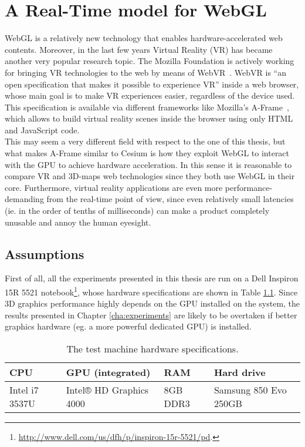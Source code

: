 ﻿%
\chapter{A Real-Time model for WebGL} \label{cha:rt_model}

WebGL is a relatively new technology that enables hardware-accelerated web
contents. Moreover, in the last few years Virtual Reality (VR) has became
another very popular research topic. The Mozilla Foundation is actively working
for bringing VR technologies to the web by means of WebVR~\cite{mozvr}. WebVR is
``an open specification that makes it possible to experience VR'' inside a web
browser, whose main goal is to make VR experiences easier, regardless of the
device used. This specification is available
via different frameworks like Mozilla's A-Frame~\cite{aframe}, which allows
to build virtual reality scenes inside the browser using only HTML and JavaScript
code.\\
This may seem a very different field with respect to the one of this
thesis, but what makes A-Frame similar to Cesium is how they exploit WebGL to
interact with the GPU to achieve hardware acceleration. In this sense it is
reasonable to compare VR and 3D-maps web technologies since they both use WebGL
in their core. Furthermore, virtual reality applications are even more
performance-demanding from the real-time point of view, since even relatively
small latencies (ie. in the order of tenths of milliseconds) can make a product
completely unusable and annoy the human eyesight.


\section{Assumptions} \label{sec:assumptions}
First of all, all the experiments presented in this thesis are run on a Dell
Inspiron 15R 5521 notebook\footnote{\url{http://www.dell.com/us/dfh/p/inspiron-15r-5521/pd}.},
whose hardware specifications are shown in Table \ref{tab:notebook_specs}.
Since 3D graphics performance highly depends on the GPU installed on the system,
the results presented in Chapter \ref{cha:experiments} are likely to be overtaken
if better graphics hardware (eg. a more powerful dedicated GPU) is installed.
\begin{table}[!htb]
    \centering
    \caption{The test machine hardware specifications.}
    \label{tab:notebook_specs}
    \begin{tabular}{|l|l|l|l|}
    \hline
    \multicolumn{1}{|l|}{\textbf{CPU}} & \multicolumn{1}{l|}{\textbf{GPU (integrated)}} & \multicolumn{1}{l|}{\textbf{RAM}} & \multicolumn{1}{l|}{\textbf{Hard drive}} \\ \hline
    Intel i7 3537U & Intel® HD Graphics 4000 & 8GB DDR3 & Samsung 850 Evo 250GB \\ \hline
    \end{tabular}
\end{table}

